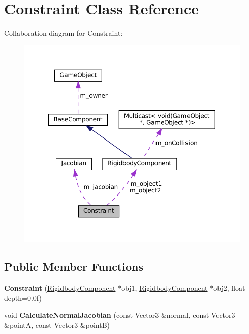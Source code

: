 \hypertarget{classConstraint}{}\section{Constraint Class Reference}
\label{classConstraint}


Collaboration diagram for Constraint\+:\nopagebreak
\begin{figure}[H]
\begin{center}
\leavevmode
\includegraphics[width=350pt]{classConstraint__coll__graph}
\end{center}
\end{figure}
\subsection*{Public Member Functions}
\begin{DoxyCompactItemize}
\item 
\mbox{\label{classConstraint_a395b6ff4b983af67254c5dfe9fdf6bb9}} 
{\bfseries Constraint} (\hyperlink{classRigidbodyComponent}{Rigidbody\+Component} $\ast$obj1, \hyperlink{classRigidbodyComponent}{Rigidbody\+Component} $\ast$obj2, float depth=0.\+0f)
\item 
\mbox{\label{classConstraint_a4b19008d8d9a6965bfc90111e5cc4efd}} 
void {\bfseries Calculate\+Normal\+Jacobian} (const Vector3 \&normal, const Vector3 \&pointA, const Vector3 \&pointB)
\end{DoxyCompactItemize}
